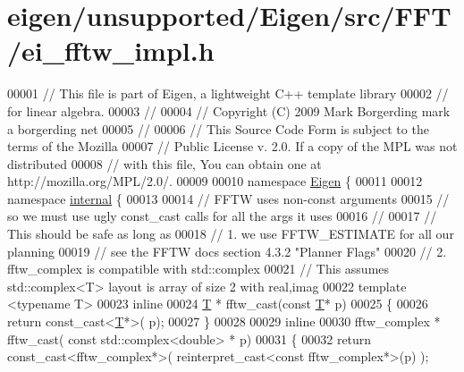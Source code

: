 \hypertarget{eigen_2unsupported_2_eigen_2src_2_f_f_t_2ei__fftw__impl_8h_source}{}\section{eigen/unsupported/\+Eigen/src/\+F\+F\+T/ei\+\_\+fftw\+\_\+impl.h}
\label{eigen_2unsupported_2_eigen_2src_2_f_f_t_2ei__fftw__impl_8h_source}

\begin{DoxyCode}
00001 \textcolor{comment}{// This file is part of Eigen, a lightweight C++ template library}
00002 \textcolor{comment}{// for linear algebra. }
00003 \textcolor{comment}{//}
00004 \textcolor{comment}{// Copyright (C) 2009 Mark Borgerding mark a borgerding net}
00005 \textcolor{comment}{//}
00006 \textcolor{comment}{// This Source Code Form is subject to the terms of the Mozilla}
00007 \textcolor{comment}{// Public License v. 2.0. If a copy of the MPL was not distributed}
00008 \textcolor{comment}{// with this file, You can obtain one at http://mozilla.org/MPL/2.0/.}
00009 
00010 \textcolor{keyword}{namespace }\hyperlink{namespace_eigen}{Eigen} \{ 
00011 
00012 \textcolor{keyword}{namespace }\hyperlink{namespaceinternal}{internal} \{
00013 
00014   \textcolor{comment}{// FFTW uses non-const arguments}
00015   \textcolor{comment}{// so we must use ugly const\_cast calls for all the args it uses}
00016   \textcolor{comment}{//}
00017   \textcolor{comment}{// This should be safe as long as }
00018   \textcolor{comment}{// 1. we use FFTW\_ESTIMATE for all our planning}
00019   \textcolor{comment}{//       see the FFTW docs section 4.3.2 "Planner Flags"}
00020   \textcolor{comment}{// 2. fftw\_complex is compatible with std::complex}
00021   \textcolor{comment}{//    This assumes std::complex<T> layout is array of size 2 with real,imag}
00022   \textcolor{keyword}{template} <\textcolor{keyword}{typename} T> 
00023   \textcolor{keyword}{inline} 
00024   \hyperlink{group___sparse_core___module_class_eigen_1_1_triplet}{T} * fftw\_cast(\textcolor{keyword}{const} \hyperlink{group___sparse_core___module_class_eigen_1_1_triplet}{T}* p)
00025   \{ 
00026       \textcolor{keywordflow}{return} \textcolor{keyword}{const\_cast<}\hyperlink{group___sparse_core___module_class_eigen_1_1_triplet}{T}*\textcolor{keyword}{>}( p); 
00027   \}
00028 
00029   \textcolor{keyword}{inline} 
00030   fftw\_complex * fftw\_cast( \textcolor{keyword}{const} std::complex<double> * p)
00031   \{
00032       \textcolor{keywordflow}{return} \textcolor{keyword}{const\_cast<}fftw\_complex*\textcolor{keyword}{>}( \textcolor{keyword}{reinterpret\_cast<}\textcolor{keyword}{const }fftw\_complex*\textcolor{keyword}{>}(p) ); 

\end{DoxyCode}
